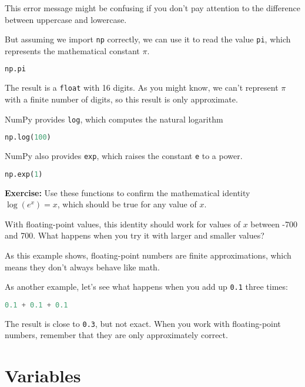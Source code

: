 This error message might be confusing if you don't pay attention to the
difference between uppercase and lowercase.

But assuming we import \passthrough{\lstinline!np!} correctly, we can
use it to read the value \passthrough{\lstinline!pi!}, which represents
the mathematical constant \(\pi\).

\begin{lstlisting}[language=Python,style=source]
np.pi
\end{lstlisting}

The result is a \passthrough{\lstinline!float!} with 16 digits. As you
might know, we can't represent \(\pi\) with a finite number of digits,
so this result is only approximate.

NumPy provides \passthrough{\lstinline!log!}, which computes the natural
logarithm

\begin{lstlisting}[language=Python,style=source]
np.log(100)
\end{lstlisting}

NumPy also provides \passthrough{\lstinline!exp!}, which raises the
constant \passthrough{\lstinline!e!} to a power.

\begin{lstlisting}[language=Python,style=source]
np.exp(1)
\end{lstlisting}

\textbf{Exercise:} Use these functions to confirm the mathematical
identity \(\log(e^x) = x\), which should be true for any value of \(x\).

With floating-point values, this identity should work for values of
\(x\) between -700 and 700. What happens when you try it with larger and
smaller values?

As this example shows, floating-point numbers are finite approximations,
which means they don't always behave like math.

As another example, let's see what happens when you add up
\passthrough{\lstinline!0.1!} three times:

\begin{lstlisting}[language=Python,style=source]
0.1 + 0.1 + 0.1
\end{lstlisting}

The result is close to \passthrough{\lstinline!0.3!}, but not exact.
When you work with floating-point numbers, remember that they are only
approximately correct.

\hypertarget{variables}{%
\section{Variables}\label{variables}}


